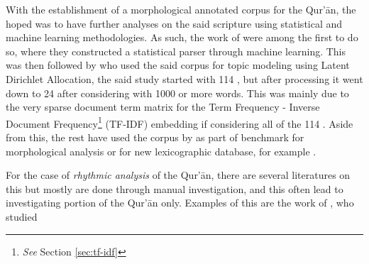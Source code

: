 With the establishment of a morphological annotated corpus for the Qur'\=an, the hoped was to have further analyses on the said scripture using statistical and machine learning methodologies. As such, the work of  were among the first to do so, where they constructed a statistical parser through machine learning. This was then followed by  who used the said corpus for topic modeling using Latent Dirichlet Allocation, the said study started with 114  , but after processing it went down to 24   after considering   with 1000 or more words. This was mainly due to the very sparse document term matrix for the Term Frequency - Inverse Document Frequency\footnote{\textit{See} Section \ref{sec:tf-idf}} (TF-IDF) embedding if considering all of the 114  . Aside from this, the rest have used the corpus by  as part of benchmark for morphological analysis or for new lexicographic database, for example .

For the case of \textit{rhythmic analysis} of the Qur'\=an, there are several literatures on this but mostly are done through manual investigation, and this often lead to investigating portion of the Qur'\=an only. Examples of this are the work of , who studied 